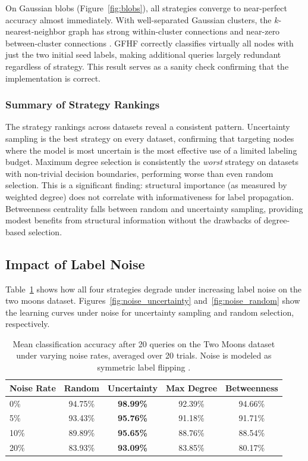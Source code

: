 \documentclass[12pt]{article}
\begin{document}
On Gaussian blobs (Figure~\ref{fig:blobs}), all strategies converge to near-perfect accuracy almost immediately. With well-separated Gaussian clusters, the $k$-nearest-neighbor graph has strong within-cluster connections and near-zero between-cluster connections \cite{Zhu2005}. GFHF correctly classifies virtually all nodes with just the two initial seed labels, making additional queries largely redundant regardless of strategy. This result serves as a sanity check confirming that the implementation is correct.

\subsubsection{Summary of Strategy Rankings}

The strategy rankings across datasets reveal a consistent pattern. Uncertainty sampling \cite{Lewis1994} is the best strategy on every dataset, confirming that targeting nodes where the model is most uncertain is the most effective use of a limited labeling budget. Maximum degree selection is consistently the \textit{worst} strategy on datasets with non-trivial decision boundaries, performing worse than even random selection. This is a significant finding: structural importance (as measured by weighted degree) does not correlate with informativeness for label propagation. Betweenness centrality \cite{Freeman1977} falls between random and uncertainty sampling, providing modest benefits from structural information without the drawbacks of degree-based selection.

\subsection{Impact of Label Noise}

Table~\ref{tab:noise_summary} shows how all four strategies degrade under increasing label noise on the two moons dataset. Figures~\ref{fig:noise_uncertainty} and~\ref{fig:noise_random} show the learning curves under noise for uncertainty sampling and random selection, respectively.

\begin{table}[ht]
\centering
\begin{tabular}{lcccc}
\toprule
\textbf{Noise Rate} & \textbf{Random} & \textbf{Uncertainty} & \textbf{Max Degree} & \textbf{Betweenness} \\
\midrule
0\%  & 94.75\% & \textbf{98.99\%} & 92.39\% & 94.66\% \\
5\%  & 93.43\% & \textbf{95.76\%} & 91.18\% & 91.71\% \\
10\% & 89.89\% & \textbf{95.65\%} & 88.76\% & 88.54\% \\
20\% & 83.93\% & \textbf{93.09\%} & 83.85\% & 80.17\% \\
\bottomrule
\end{tabular}
\caption{Mean classification accuracy after 20 queries on the Two Moons dataset under varying noise rates, averaged over 20 trials. Noise is modeled as symmetric label flipping \cite{Fang2014}.}
\label{tab:noise_summary}
\end{table}
\end{document}

